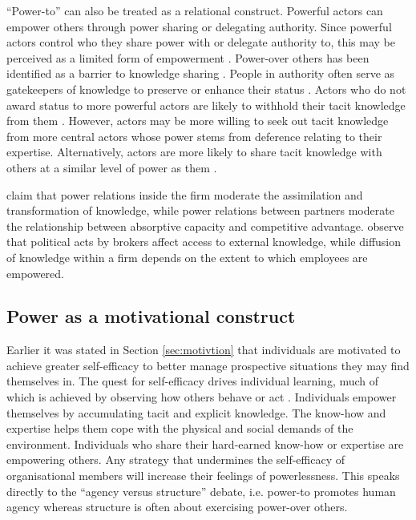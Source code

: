\enquote{Power-to} can also be treated as a relational construct. Powerful actors can empower others through power sharing or delegating authority. Since powerful actors control who they share power with or delegate authority to, this may be perceived as a limited form of empowerment \citep{conger1988empowerment}. Power-over others has been identified as a barrier to knowledge sharing \citep{riege2005three,suppiah2011organisational}. People in authority often serve as gatekeepers of knowledge to preserve or enhance their status \citep{cross2001beyond}. Actors who do not award status to more powerful actors are likely to withhold their tacit knowledge from them \citep{cabrera2006determinants}. However, actors may be more willing to seek out tacit knowledge from more central actors whose power stems from deference relating to their expertise. Alternatively, actors are more likely to share tacit knowledge with others at a similar level of power as them \citep{cabrera2006determinants}. \medskip

\citet{todorova2007absorptive} claim that power relations inside the firm moderate the assimilation and transformation of knowledge, while power relations between partners moderate the relationship between absorptive capacity and competitive advantage. \citet{easterby2008absorptive} observe that political acts by brokers affect access to external knowledge, while diffusion of knowledge within a firm depends on the extent to which employees are empowered. 

\subsection{Power as a motivational construct}

Earlier it was stated in Section \ref{sec:motivtion} that individuals are motivated to achieve greater self-efficacy to better manage prospective situations they may find themselves in. The quest for self-efficacy drives individual learning, much of which is achieved by observing how others behave or act \citep{bandura1994self}. Individuals empower themselves by accumulating tacit and explicit knowledge. The know-how and expertise helps them cope with the physical and social demands of the environment. Individuals who share their hard-earned know-how or expertise are empowering others. Any strategy that undermines the self-efficacy of organisational members will increase their feelings of powerlessness. This speaks directly to the \enquote{agency versus structure} debate, i.e. power-to promotes human agency whereas structure is often about exercising power-over others.

